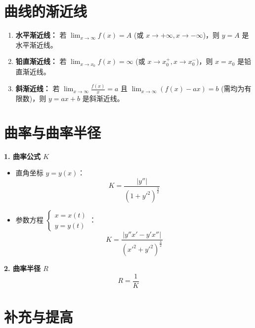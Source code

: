 \documentclass[a4paper,12pt]{ctexart}
\newenvironment{purplebox}
  {\begin{tcolorbox}[colback=white, colframe=boxpurple, boxrule=1pt, sharp corners, title=\textbf{定义/定理/核心公式}]}
  {\end{tcolorbox}}
\begin{document}
\section{曲线的渐近线}

\begin{enumerate}
    \item \textbf{水平渐近线：}
    若 $\lim_{x \to \infty} f(x) = A$ (或 $x \to +\infty, x \to -\infty$)，则 $y = A$ 是水平渐近线。
    
    \item \textbf{铅直渐近线：}
    若 $\lim_{x \to x_0} f(x) = \infty$ (或 $x \to x_0^+, x \to x_0^-$)，则 $x = x_0$ 是铅直渐近线。
    
    \item \textbf{斜渐近线：}
    若 $\lim_{x \to \infty} \frac{f(x)}{x} = a$ 且 $\lim_{x \to \infty} (f(x) - ax) = b$ (需均为有限数)，则 $y = ax + b$ 是斜渐近线。
\end{enumerate}

\section{曲率与曲率半径}

\begin{purplebox}
    \textbf{1. 曲率公式 $K$}
    \begin{itemize}
        \item 直角坐标 $y=y(x)$：
        \[ K = \frac{|y''|}{(1+y'^2)^{\frac{3}{2}}} \]
        \item 参数方程 $\begin{cases} x = x(t) \\ y = y(t) \end{cases}$：
        \[ K = \frac{|y''x' - y'x''|}{(x'^2+y'^2)^{\frac{3}{2}}} \]
    \end{itemize}
    \textbf{2. 曲率半径 $R$}
    \[ R = \frac{1}{K} \]
\end{purplebox}

\section{补充与提高}
\end{document}
